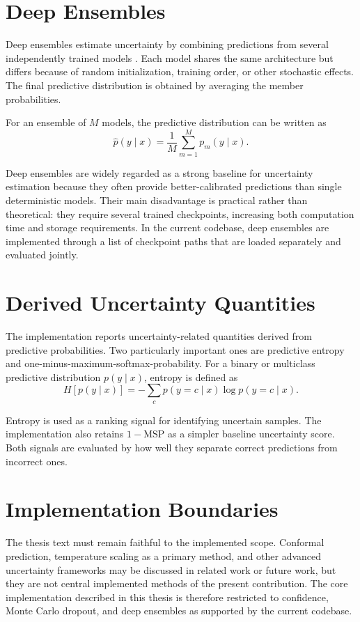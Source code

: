 \section{Deep Ensembles}

Deep ensembles estimate uncertainty by combining predictions from several independently trained models \cite{lakshminarayanan2017simple}. Each model shares the same architecture but differs because of random initialization, training order, or other stochastic effects. The final predictive distribution is obtained by averaging the member probabilities.

For an ensemble of $M$ models, the predictive distribution can be written as
\begin{equation}
    \hat{p}(y \mid x) = \frac{1}{M} \sum_{m=1}^{M} p_m(y \mid x).
\end{equation}

Deep ensembles are widely regarded as a strong baseline for uncertainty estimation because they often provide better-calibrated predictions than single deterministic models. Their main disadvantage is practical rather than theoretical: they require several trained checkpoints, increasing both computation time and storage requirements. In the current codebase, deep ensembles are implemented through a list of checkpoint paths that are loaded separately and evaluated jointly.

\section{Derived Uncertainty Quantities}

The implementation reports uncertainty-related quantities derived from predictive probabilities. Two particularly important ones are predictive entropy and one-minus-maximum-softmax-probability. For a binary or multiclass predictive distribution $p(y \mid x)$, entropy is defined as
\begin{equation}
    H[p(y \mid x)] = - \sum_c p(y=c \mid x) \log p(y=c \mid x).
\end{equation}

Entropy is used as a ranking signal for identifying uncertain samples. The implementation also retains $1-\text{MSP}$ as a simpler baseline uncertainty score. Both signals are evaluated by how well they separate correct predictions from incorrect ones.

\section{Implementation Boundaries}

The thesis text must remain faithful to the implemented scope. Conformal prediction, temperature scaling as a primary method, and other advanced uncertainty frameworks may be discussed in related work or future work, but they are not central implemented methods of the present contribution. The core implementation described in this thesis is therefore restricted to confidence, Monte Carlo dropout, and deep ensembles as supported by the current codebase.
